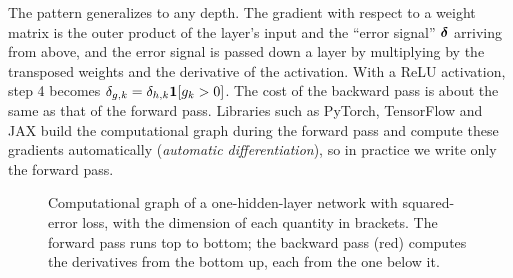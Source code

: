 The pattern generalizes to any depth. The gradient with respect to a weight matrix is the outer product of the layer's input and the ``error signal'' $\boldsymbol{\delta}$ arriving from above, and the error signal is passed down a layer by multiplying by the transposed weights and the derivative of the activation. With a ReLU activation, step 4 becomes $\delta_{g,k}=\delta_{h,k}\mathbf{1}[g_k>0]$. The cost of the backward pass is about the same as that of the forward pass. Libraries such as PyTorch, TensorFlow and JAX build the computational graph during the forward pass and compute these gradients automatically (\emph{automatic differentiation}), so in practice we write only the forward pass.

\begin{figure}[t]
  \centering
  \caption{Computational graph of a one-hidden-layer network with squared-error loss, with the dimension of each quantity in brackets. The forward pass runs top to bottom; the backward pass (red) computes the derivatives from the bottom up, each from the one below it.}
  \label{fig:backprop}
\end{figure}

